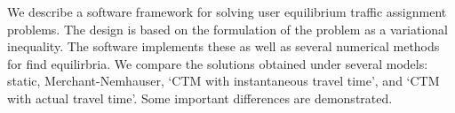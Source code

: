 We describe a software framework for solving user equilibrium traffic assignment problems. The design is based on the formulation of the problem as a variational inequality. The software implements these as well as several numerical methods for find equilirbria. We compare the solutions obtained under several models: static, Merchant-Nemhauser, `CTM with instantaneous travel time', and `CTM with actual travel time'. Some important differences are demonstrated. 



